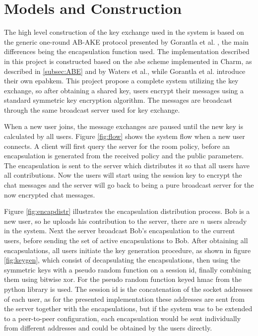 \section{Models and Construction}\label{sec:models}
The high level construction of the key exchange used in the system is based on the generic one-round AB-AKE protocol presented by Gorantla et al. \cite{gorantla2010attribute}, the main differences being the encapsulation function used. The implementation described in this project is constructed based on the \gls{abe} scheme implemented in Charm, as described in \ref{subsec:ABE} and  by Waters et al.\cite{abe_waters09}, while Gorantla et al.\cite{gorantla2010attribute} introduce their own \gls{epabkem}. This project propose a complete system utilizing the key exchange, so after obtaining a shared key, users encrypt their messages using a standard symmetric key encryption algorithm. The messages are broadcast through the same broadcast server used for key exchange. 
\par When a new user joins, the message exchanges are paused until the new key is calculated by all users. Figure \ref{fig:flow} shows the system flow when a new user connects. A client will first query the server for the room policy, before an encapsulation is generated from the received policy and the public parameters. The encapsulation is sent to the server which distributes it so that all users have all contributions. Now the users will start using the session key to encrypt the chat messages and the server will go back to being a pure broadcast server for the now encrypted chat messages. 
\par Figure \ref{fig:encapdistr} illustrates the encapsulation distribution process. Bob is a new user, so he uploads his contribution to the server, there are $n$ users already in the system. Next the server broadcast Bob's encapsulation to the current users, before sending the set of active encapsulations to Bob. After obtaining all encapsulations, all users initiate the key generation procedure, as shown in figure \ref{fig:keygen}, which consist of decapsulating the encapsulations, then using the symmetric keys with a pseudo random function on a session id, finally combining them using bitwise xor. For the pseudo random function keyed hmac from the python library is used. The session id is the concatenation of the socket addresses of each user, as for the presented implementation these addresses are sent from the server together with the encapsulations, but if the system was to be extended to a peer-to-peer configuration, each encapsulation would be sent individually from different addresses and could be obtained by the users directly. 

